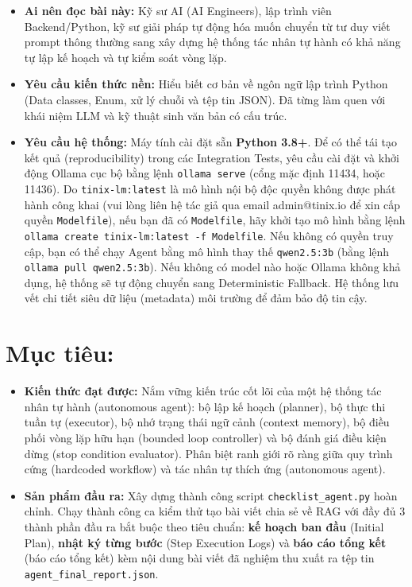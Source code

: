 \documentclass[]{article}
\providecommand{\tightlist}{%
  \setlength{\itemsep}{0pt}\setlength{\parskip}{0pt}}
\begin{document}
\begin{itemize}
\tightlist
\item
  \textbf{Ai nên đọc bài này:} Kỹ sư AI (AI Engineers), lập trình viên Backend/Python, kỹ sư giải pháp tự động hóa muốn chuyển từ tư duy viết prompt thông thường sang xây dựng hệ thống tác nhân tự hành có khả năng tự lập kế hoạch và tự kiểm soát vòng lặp.
\item
  \textbf{Yêu cầu kiến thức nền:} Hiểu biết cơ bản về ngôn ngữ lập trình Python (Data classes, Enum, xử lý chuỗi và tệp tin JSON). Đã từng làm quen với khái niệm LLM và kỹ thuật sinh văn bản có cấu trúc.
\item
  \textbf{Yêu cầu hệ thống:} Máy tính cài đặt sẵn \textbf{Python 3.8+}. Để có thể tái tạo kết quả (reproducibility) trong các Integration Tests, yêu cầu cài đặt và khởi động Ollama cục bộ bằng lệnh \texttt{ollama serve} (cổng mặc định 11434, hoặc 11436). Do \texttt{tinix-lm:latest} là mô hình nội bộ độc quyền không được phát hành công khai (vui lòng liên hệ tác giả qua email admin@tinix.io để xin cấp quyền \texttt{Modelfile}), nếu bạn đã có \texttt{Modelfile}, hãy khởi tạo mô hình bằng lệnh \texttt{ollama create tinix-lm:latest -f Modelfile}. Nếu không có quyền truy cập, bạn có thể chạy Agent bằng mô hình thay thế \texttt{qwen2.5:3b} (bằng lệnh \texttt{ollama pull qwen2.5:3b}). Nếu không có model nào hoặc Ollama không khả dụng, hệ thống sẽ tự động chuyển sang Deterministic Fallback. Hệ thống lưu vết chi tiết siêu dữ liệu (metadata) môi trường để đảm bảo độ tin cậy.
\end{itemize}

\hypertarget{muc-tieu}{%
\section*{Mục tiêu:}\label{muc-tieu}}

\begin{itemize}
\tightlist
\item
  \textbf{Kiến thức đạt được:} Nắm vững kiến trúc cốt lõi của một hệ thống tác nhân tự hành (autonomous agent): bộ lập kế hoạch (planner), bộ thực thi tuần tự (executor), bộ nhớ trạng thái ngữ cảnh (context memory), bộ điều phối vòng lặp hữu hạn (bounded loop controller) và bộ đánh giá điều kiện dừng (stop condition evaluator). Phân biệt ranh giới rõ ràng giữa quy trình cứng (hardcoded workflow) và tác nhân tự thích ứng (autonomous agent).
\item
  \textbf{Sản phẩm đầu ra:} Xây dựng thành công script \texttt{checklist\_agent.py} hoàn chỉnh. Chạy thành công ca kiểm thử tạo bài viết chia sẻ về RAG với đầy đủ 3 thành phần đầu ra bắt buộc theo tiêu chuẩn: \textbf{kế hoạch ban đầu} (Initial Plan), \textbf{nhật ký từng bước} (Step Execution Logs) và \textbf{báo cáo tổng kết} (báo cáo tổng kết) kèm nội dung bài viết đã nghiệm thu xuất ra tệp tin \texttt{agent\_final\_report.json}.
\end{itemize}
\end{document}
